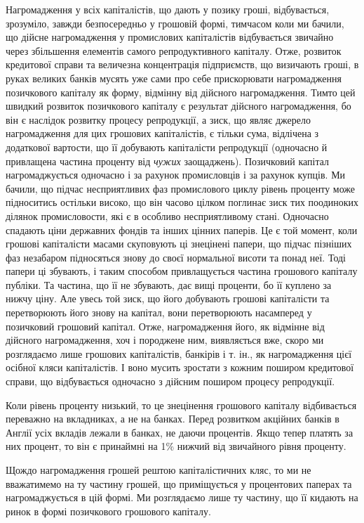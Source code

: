 Нагромадження у всіх капіталістів, що дають у позику гроші, відбувається,
зрозуміло, завжди безпосередньо у грошовій формі, тимчасом коли ми бачили, що
дійсне нагромадження у промислових капіталістів відбувається звичайно через
збільшення елементів самого репродуктивного капіталу. Отже, розвиток кредитової
справи та величезна концентрація підприємств, що визичають гроші, в руках
великих банків мусять уже сами про себе прискорювати нагромадження позичкового
капіталу як форму, відмінну від дійсного нагромадження. Тимто цей
швидкий розвиток позичкового капіталу є результат дійсного нагромадження,
бо він є наслідок розвитку процесу репродукції, а зиск, що являє джерело нагромадження
для цих грошових капіталістів, є тільки сума, відлічена з додаткової
вартости, що її добувають капіталісти репродукції (одночасно й привлащена
частина проценту від \emph{чужих} заощаджень). Позичковий капітал нагромаджується
одночасно і за рахунок промисловців і за рахунок купців. Ми бачили, що
підчас несприятливих фаз промислового циклу рівень проценту може підноситись
остільки високо, що він часово цілком поглинає зиск тих поодиноких ділянок
промисловости, які є в особливо несприятливому стані. Одночасно спадають ціни
державних фондів та інших цінних паперів. Це є той момент, коли грошові
капіталісти масами скуповують ці знецінені папери, що підчас пізніших фаз
незабаром підносяться знову до своєї нормальної висоти та понад неї. Тоді
папери ці збувають, і таким способом привлащується частина грошового капіталу
публіки. Та частина, що її не збувають, дає вищі проценти, бо її куплено
за нижчу ціну. Але увесь той зиск, що його добувають грошові капіталісти та
перетворюють його знову на капітал, вони перетворюють насамперед у позичковий
грошовий капітал. Отже, нагромадження його, як відмінне від дійсного нагромадження,
хоч і породжене ним, виявляється вже, скоро ми розглядаємо лише грошових
капіталістів, банкірів і т. ін., як нагромадження цієї осібної кляси капіталістів.
І воно мусить зростати з кожним поширом кредитової справи, що відбувається
одночасно з дійсним поширом процесу репродукції.

Коли рівень проценту низький, то це знецінення грошового капіталу відбивається
переважно на вкладниках, а не на банках. Перед розвитком акційних
банків в Англії  усіх вкладів лежали в банках, не даючи процентів. Якщо тепер
платять за них процент, то він є принаймні на 1\% нижчий від звичайного
рівня проценту.

Щождо нагромадження грошей рештою капіталістичних кляс, то ми не
вважатимемо на ту частину грошей, що приміщується у процентових паперах
та нагромаджується в цій формі. Ми розглядаємо лише ту частину, що її кидають
на ринок в формі позичкового грошового капіталу.

